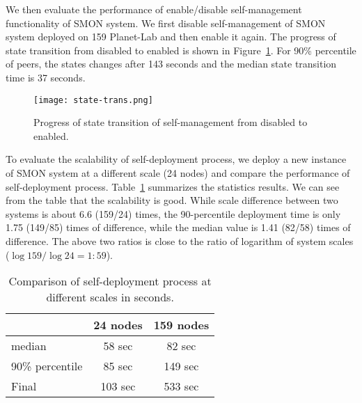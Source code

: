 We then evaluate the performance of enable/disable
self-management functionality of SMON system. We first
disable self-management of SMON system deployed on 159
Planet-Lab and then enable it again. The progress of state
transition from disabled to enabled is shown in
Figure~\ref{fig:state-transition}. For 90\%
percentile of peers, the states changes after 143
seconds and the median state transition time is 37 seconds.


\begin{figure}[t]
\centering
\texttt{[image: state-trans.png]}
\caption{Progress of state transition of self-management from disabled to
enabled.}
\label{fig:state-transition}
\end{figure}

To evaluate the scalability of self-deployment process, we deploy
a new instance of SMON system at a different scale (24 nodes) and
compare the performance of self-deployment process.
Table~\ref{tbl:scalability} summarizes the statistics results.
We can see from the table that the scalability is good.
While scale difference between two systems is about 6.6
(159/24) times, the
90-percentile deployment time is only 1.75 (149/85) times of
difference, while the median value is 1.41 (82/58) times of
difference. The above two ratios is close to the ratio of
logarithm of system scales ($\log 159 / \log 24 = 1:59$).

\begin{table}
\centering
\begin{tabular}{|l|c|c|}
\hline
  & 24 nodes & 159 nodes\\
\hline
median & 58 sec & 82 sec \\
\hline
90\% percentile & 85 sec & 149 sec\\
\hline
Final & 103 sec & 533 sec\\
\hline
\end{tabular}
\caption{Comparison of self-deployment process at different
scales in seconds.}
\label{tbl:scalability}
\end{table}

